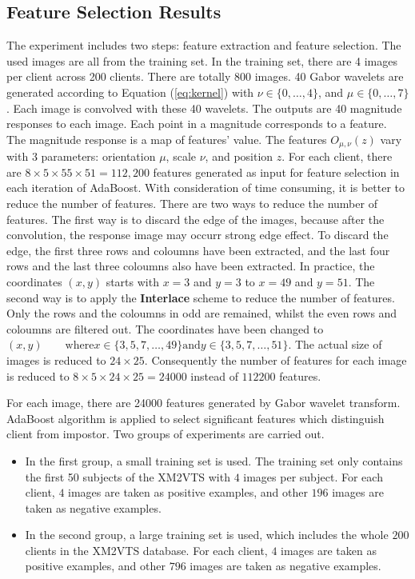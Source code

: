 \subsection{Feature Selection Results}
\label{sec:faceveri:result1}
The experiment includes two steps: feature extraction and feature selection. The used images are all from the training set. In the training set, there are 4 images per client across 200 clients. There are totally 800 images. 40 Gabor wavelets are generated according to \mbox{Equation} (\ref{eq:kernel}) with $\nu\in\{0,\ldots,4\}$, and $\mu\in\{0,\ldots,7\}$. Each image is convolved with these 40 wavelets. The outputs are 40 magnitude responses to each image. Each point in a magnitude corresponds to a feature. The magnitude response is a map of features' value. The features $O_{\mu,\nu}(z)$ vary with 3 parameters: orientation $\mu$, scale $\nu$, and position $z$. For each client, there are $8\times5\times55\times51=112,200$ features generated as input for feature selection in each iteration of AdaBoost. With consideration of time consuming, it is better to reduce the number of features. There are two ways to reduce the number of features. The first way is to discard the edge of the images, because after the convolution, the response image may occurr strong edge effect. To discard the edge, the first three rows and coloumns have been extracted, and the last four rows and the last three coloumns also have been extracted. In practice, the coordinates $(x,y)$ starts with $x=3$ and $y=3$ to $x=49$ and $y=51$. The second way is to apply the \textbf{Interlace} scheme to reduce the number of features. Only the rows and the coloumns in odd are remained, whilst the even rows and coloumns are filtered out. The coordinates have been changed to $(x,y)\qquad \textrm{where} x\in\{3,5,7,\ldots,49\}\textrm{and}y\in\{3,5,7,\ldots,51\}$. The actual size of images is reduced to $24\times25$. Consequently the number of features for each image is reduced to $8\times5\times24\times25=24000$ instead of $112200$ features.

For each image, there are 24000 features generated by Gabor wavelet transform. AdaBoost algorithm is applied to select significant features which distinguish client from impostor. Two groups of experiments are carried out.
\begin{itemize}
 \item In the first group, a small training set is used. The training set only contains the first 50 subjects of the XM2VTS with $4$ images per subject. For each client, $4$ images are taken as positive examples, and other $196$ images are taken as negative examples.
 \item In the second group, a large training set is used, which includes the whole $200$ clients in the XM2VTS database. For each client, $4$ images are taken as positive examples, and other $796$ images are taken as negative examples.
\end{itemize}
 
